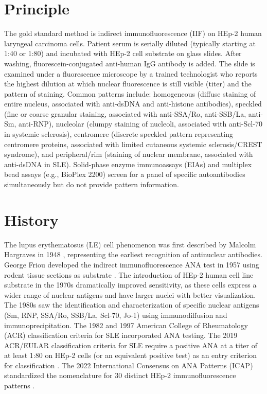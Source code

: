 \section*{Principle}
The gold standard method is indirect immunofluorescence (IIF) on HEp-2 human laryngeal carcinoma cells. Patient serum is serially diluted (typically starting at 1:40 or 1:80) and incubated with HEp-2 cell substrate on glass slides. After washing, fluorescein-conjugated anti-human IgG antibody is added. The slide is examined under a fluorescence microscope by a trained technologist who reports the highest dilution at which nuclear fluorescence is still visible (titer) and the pattern of staining. Common patterns include: homogeneous (diffuse staining of entire nucleus, associated with anti-dsDNA and anti-histone antibodies), speckled (fine or coarse granular staining, associated with anti-SSA/Ro, anti-SSB/La, anti-Sm, anti-RNP), nucleolar (clumpy staining of nucleoli, associated with anti-Scl-70 in systemic sclerosis), centromere (discrete speckled pattern representing centromere proteins, associated with limited cutaneous systemic sclerosis/CREST syndrome), and peripheral/rim (staining of nuclear membrane, associated with anti-dsDNA in SLE). Solid-phase enzyme immunoassays (EIAs) and multiplex bead assays (e.g., BioPlex 2200) screen for a panel of specific autoantibodies simultaneously but do not provide pattern information.

\section*{History}
The lupus erythematosus (LE) cell phenomenon was first described by Malcolm Hargraves in 1948 \cite{hargraves1948le}, representing the earliest recognition of antinuclear antibodies. George Friou developed the indirect immunofluorescence ANA test in 1957 using rodent tissue sections as substrate \cite{friou1958interaction}. The introduction of HEp-2 human cell line substrate in the 1970s dramatically improved sensitivity, as these cells express a wider range of nuclear antigens and have larger nuclei with better visualization. The 1980s saw the identification and characterization of specific nuclear antigens (Sm, RNP, SSA/Ro, SSB/La, Scl-70, Jo-1) using immunodiffusion and immunoprecipitation. The 1982 and 1997 American College of Rheumatology (ACR) classification criteria for SLE incorporated ANA testing. The 2019 ACR/EULAR classification criteria for SLE require a positive ANA at a titer of at least 1:80 on HEp-2 cells (or an equivalent positive test) as an entry criterion for classification \cite{aringer2019eular}. The 2022 International Consensus on ANA Patterns (ICAP) standardized the nomenclature for 30 distinct HEp-2 immunofluorescence patterns \cite{damoiseaux2019clinical}.

